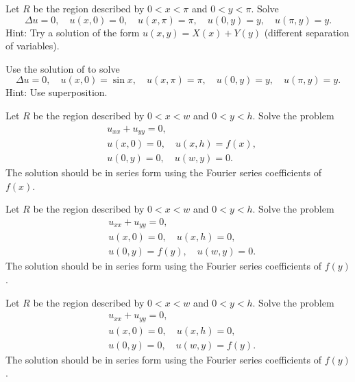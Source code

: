 \begin{exercise} \label{dirich:diffsepexr}
Let $R$ be the region described by $0 < x < \pi$ and $0 < y < \pi$.
Solve
\begin{equation*}
\Delta u = 0,
\quad u(x,0) = 0,
\quad u(x,\pi) = \pi,
\quad u(0,y) = y,
\quad u(\pi,y) = y .
\end{equation*}
Hint: Try a solution of the form $u(x,y) = X(x) + Y(y)$ (different separation
of variables).
\end{exercise}

\begin{exercise}
Use the solution of  to solve
\begin{equation*}
\Delta u = 0,
\quad u(x,0) = \sin x,
\quad u(x,\pi) = \pi,
\quad u(0,y) = y,
\quad u(\pi,y) = y .
\end{equation*}
Hint: Use superposition.
\end{exercise}

\begin{exercise}
Let $R$ be the region described by $0 < x < w$ and $0 < y < h$.
Solve the problem
\begin{align*}
& u_{xx} + u_{yy} = 0, \\
& u(x,0) = 0, \quad u(x,h) = f(x), \\
& u(0,y) = 0, \quad u(w,y) = 0.
\end{align*}
The solution should be in series form using the Fourier series coefficients
of $f(x)$.
\end{exercise}

\begin{exercise}
Let $R$ be the region described by $0 < x < w$ and $0 < y < h$.
Solve the problem
\begin{align*}
& u_{xx} + u_{yy} = 0, \\
& u(x,0) = 0, \quad u(x,h) = 0, \\
& u(0,y) = f(y), \quad u(w,y) = 0.
\end{align*}
The solution should be in series form using the Fourier series coefficients
of $f(y)$.
\end{exercise}

\begin{exercise}
Let $R$ be the region described by $0 < x < w$ and $0 < y < h$.
Solve the problem
\begin{align*}
& u_{xx} + u_{yy} = 0, \\
& u(x,0) = 0, \quad u(x,h) = 0, \\
& u(0,y) = 0, \quad u(w,y) = f(y).
\end{align*}
The solution should be in series form using the Fourier series coefficients
of $f(y)$.
\end{exercise}


